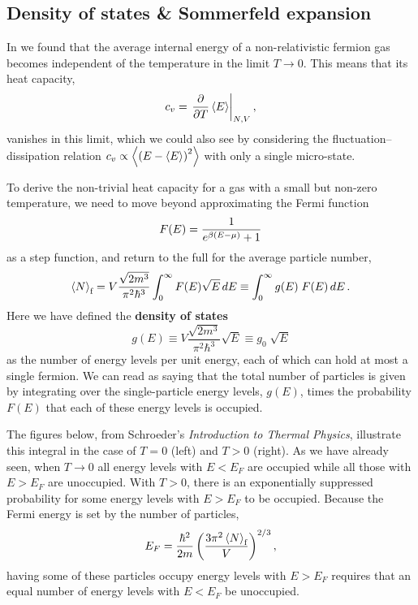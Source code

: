 \subsection{\label{sec:Sommerfeld}Density of states \& Sommerfeld expansion}
In  we found that the average internal energy of a non-relativistic fermion gas becomes independent of the temperature in the limit $T \to 0$.
This means that its heat capacity,
\begin{equation*}
  c_v = \left. \frac{\partial }{\partial T} \left\langle E \right\rangle \right|_{N,V},
\end{equation*}
vanishes in this limit, which we could also see by considering the fluctuation--dissipation relation $c_v \propto \left\langle \left(E - \left\langle E \right\rangle\right)^2 \right\rangle$ with only a single micro-state. %

To derive the non-trivial heat capacity for a gas with a small but non-zero temperature, we need to move beyond approximating the Fermi function
\begin{equation*}
  F(E) = \frac{1}{e^{\beta(E - \mu)} + 1}
\end{equation*}
as a step function, and return to the full  for the average particle number,
\begin{equation}
  \label{eq:number}
  \left\langle N \right\rangle_{\text{f}} = V \frac{\sqrt{2m^3}}{\pi^2 \hbar^3} \int_0^{\infty} F(E) \sqrt{E} \mathop{dE} \equiv \int_0^{\infty} g(E) \; F(E) \mathop{dE}.
\end{equation}
Here we have defined the \textbf{density of states}
\begin{equation*}
  g(E) \equiv V \frac{\sqrt{2m^3}}{\pi^2 \hbar^3} \sqrt{E} \equiv g_0 \; \sqrt{E}
\end{equation*}
as the number of energy levels per unit energy, each of which can hold at most a single fermion.
We can read  as saying that the total number of particles is given by integrating over the single-particle energy levels, $g(E)$, times the probability $F(E)$ that each of these energy levels is occupied.

The figures below, from Schroeder's \textit{Introduction to Thermal Physics}, illustrate this integral in the case of $T = 0$ (left) and $T > 0$ (right).
As we have already seen, when $T \to 0$ all energy levels with $E < E_F$ are occupied while all those with $E > E_F$ are unoccupied.
With $T > 0$, there is an exponentially suppressed probability for some energy levels with $E > E_F$ to be occupied.
Because the Fermi energy is set by the number of particles,
\begin{equation*}
  E_F = \frac{\hbar^2}{2m}\left(\frac{3\pi^2 \left\langle N \right\rangle_{\text{f}}}{V}\right)^{2 / 3},
\end{equation*}
having some of these particles occupy energy levels with $E > E_F$ requires that an equal number of energy levels with $E < E_F$ be unoccupied.

